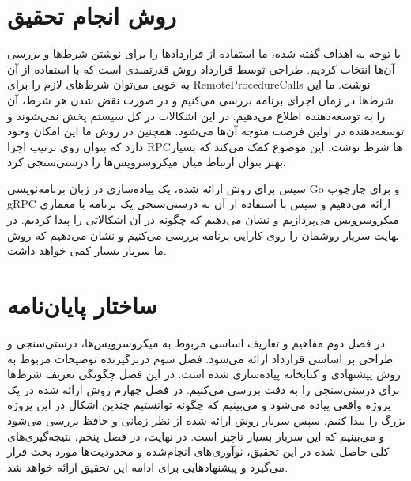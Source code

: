 \section{روش انجام تحقیق}
با توجه به اهداف گفته شده، ما استفاده از قراردادها را برای نوشتن شرط‌ها و بررسی آن‌ها انتخاب کردیم. طراحی توسط قرارداد روش قدرتمندی است که با استفاده از آن به خوبی می‌توان شرط‌های لازم را برای
\glspl{RemoteProcedureCall}
نوشت. ما این شرط‌ها در زمان اجرای برنامه بررسی می‌کنیم و در صورت نقض شدن هر شرط، آن را به توسعه‌دهنده اطلاع می‌دهیم. در این اشکالات در کل سیستم پخش نمی‌شوند و توسعه‌دهنده در اولین فرصت متوجه آن‌ها می‌شود. همچنین در روش ما این امکان وجود دارد که بتوان روی ترتیب اجرا
\gls{RPC}ها
شرط نوشت. این موضوع کمک می‌کند که بسیار بهتر بتوان ارتباط میان میکروسرویس‌ها را درستی‌سنجی کرد.

سپس برای روش ارائه شده، یک پیاده‌سازی در زبان برنامه‌نویسی
Go \cite{golang}
و برای چارچوب
gRPC \cite{grpc}
ارائه می‌دهیم و سپس با استفاده از آن به درستی‌سنجی یک برنامه با معماری میکروسرویس می‌پردازیم و نشان می‌دهیم که چگونه در آن اشکالاتی را پیدا کردیم. در نهایت سربار روشمان را روی کارایی برنامه بررسی می‌کنیم و نشان می‌دهیم که روش ما سربار بسیار کمی خواهد داشت.

\section{ساختار پایان‌نامه}
در فصل دوم مفاهیم و تعاریف اساسی مربوط به میکروسرویس‌ها، درستی‌سنجی و طراحی بر اساسی قرارداد ارائه می‌شود. فصل سوم دربرگیرنده توضیحات مربوط به روش پیشنهادی و کتابخانه پیاده‌سازی شده است. در این فصل چگونگی تعریف شرط‌ها برای درستی‌سنجی را به دقت بررسی می‌کنیم. در فصل چهارم روش ارائه شده در یک پروژه واقعی پیاده می‌شود و می‌بینیم که چگونه توانستیم چندین اشکال در این پروژه بزرگ را پیدا کنیم. سپس سربار روش ارائه شده از نظر زمانی و حافظ بررسی می‌شود و می‌بینیم که این سربار بسیار ناچیز است. در نهایت، در فصل پنجم، نتیجه‌گیری‌های کلی حاصل شده در این تحقیق، نوآوری‌های انجام‌شده و محدودیت‌ها مورد بحث قرار می‌گیرد و پیشنهادهایی برای ادامه این تحقیق ارائه خواهد شد.
